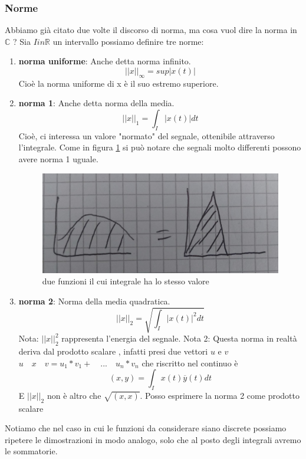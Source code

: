 \documentclass[a4paper]{article}
\newcommand{\R}[0]{\mathbb{R}}
\newcommand{\C}[0]{\mathbb{C}}
\begin{document}
\subsubsection{Norme}
\label{section:norme}
Abbiamo già citato due volte il discorso di norma, ma cosa vuol dire la norma in $\C$ ?
Sia $I in \R $ un intervallo possiamo definire tre norme: 
\begin{enumerate}
	\item \textbf{norma uniforme}: Anche detta norma infinito.
		$$ ||x||_{\infty} = sup|x(t)|$$
		Cioè la norma uniforme di x è il suo estremo superiore.
	\item \textbf{norma 1}: Anche detta norma della media.
		$$ ||x||_1 = \int_I |x(t)| dt$$
		Cioè, ci interessa un valore "normato" del segnale, ottenibile attraverso l'integrale.
		Come in figura \ref{img:norma1_uguale} si può notare che segnali molto differenti possono avere norma 1 uguale.
		\begin{figure}[h]
			\includegraphics[width=\textwidth]{norma1_uguale.jpeg}
			\caption{due funzioni il cui integrale ha lo stesso valore}
			\label{img:norma1_uguale}
		\end{figure}
	\item \textbf{norma 2}: Norma della media quadratica.
		$$ ||x||_2 = \sqrt{\int_I |x(t)|^2 dt}$$
		Nota: $||x||_2^2$ rappresenta l'energia del segnale.  
		Nota 2: Questa norma in realtà deriva dal prodotto scalare , infatti presi due vettori $u$ e $v$ $u\quad x\quad v = u_1 * v_1+ \quad ... \quad u_n * v_n$ che riscritto nel continuo è
		$$(x,y) = \int_I x(t)\overline{y}(t)dt$$
		E $||x||_2$ non è altro che  $\sqrt{(x,x)}$.
		Posso esprimere la norma 2 come prodotto scalare
\end{enumerate}
Notiamo che nel caso in cui le funzioni da considerare siano discrete possiamo ripetere le dimostrazioni in modo analogo, solo che al posto degli integrali avremo le sommatorie.
\end{document}
